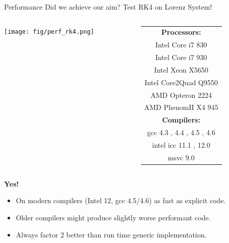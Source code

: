 \documentclass{beamer}
\begin{document}
\begin{frame}{Performance}
Did we achieve our aim? Test RK4 on Lorenz System!

\pause
\begin{columns}
\begin{column}{0.55\linewidth}
\texttt{[image: fig/perf\_rk4.png]}
\end{column}
\begin{column}{0.4\linewidth}
\begin{scriptsize}
  \begin{tabular}[b]{c}
    \textbf{Processors:} \\
    Intel Core i7 830 \\
    Intel Core i7 930 \\
    Intel Xeon X5650 \\
    Intel Core2Quad Q9550 \\
    AMD Opteron 2224 \\
    AMD PhenomII X4 945 \\
    \hline
    \textbf{Compilers:} \\
    gcc 4.3 , 4.4 , 4.5 , 4.6 \\
    intel icc 11.1 , 12.0 \\
    msvc 9.0
  \end{tabular}               
\end{scriptsize}
\end{column}
\end{columns}

\pause
\begin{center}
\textbf{Yes!}
\end{center}
\pause%
\begin{small}
\begin{itemize}
\item On modern compilers (Intel 12, gcc 4.5/4.6) as fast as explicit code.
\item Older compilers might produce slightly worse performant code.
\item Always factor 2 better than run time generic implementation.
\end{itemize}
\end{small}

\end{frame}
\end{document}
